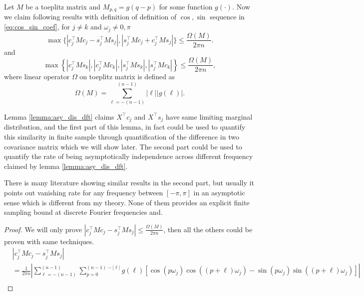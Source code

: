 \begin{lem}
\label{lemma: bound_toeplitz}
Let $M$ be a toeplitz matrix and $M_{p,q} = g(q-p)$ for some function $g(\cdot)$. Now we claim following results with definition of definition of $\cos, \sin$ sequence in \ref{eq:cos_sin_coef}, for $j\neq k$ and $\omega_j \neq 0, \pi$
\begin{equation*}
\max\{|c_j^\top M c_j - s_j^\top M s_j|, |s_j^\top M c_j + c_j^\top M s_j|\}\le \frac{\Omega(M)}{2\pi n}.
\end{equation*}
and 
\begin{equation*}
\max\left\{|c_j^\top M s_k|, |c_j^\top M c_k|, |s_j^\top M s_k|, |s_j^\top M c_k|\right\} \le \frac{\Omega(M)}{2\pi n},
\end{equation*}
where linear operator $\Omega$ on toeplitz matrix is defined as 
\begin{equation}
\Omega(M) = \sum_{\ell = -(n-1)}^{(n-1)} |\ell| |g(\ell)|.   
\end{equation}
\begin{remark}
Lemma \ref{lemma:asy_dis_dft} claims $X^\top c_j$ and $X^\top s_j$ have same limiting marginal distribution, 
and the first part of this lemma, in fact could be used to quantify this similarity in finite sample through quantification of the difference in two covariance matrix
which we will show later. The second part could be used to quantify the rate of being asymptotically independence across different frequency claimed by lemma \ref{lemma:asy_dis_dft}. \par 
There is many literature showing similar results in the second part, but usually it points out vanishing rate for any frequency between $[-\pi, \pi]$ in an asymptotic sense which is different from my theory. None of them provides an explicit finite sampling bound at discrete Fourier frequencies and. 
\end{remark}
\begin{proof}
We will only prove $|c_j^\top M c_j - s_j^\top M s_j|\le \frac{\Omega(M)}{2\pi n}$, then all the others could be proven with same techniques. %
\begin{equation}
\label{eq:similarity_real_im}
\begin{aligned}
 &|c_j^\top M c_j - s_j^\top M s_j| \\
 &=\frac{1}{2\pi n}\left|\sum_{\ell=-(n-1)}^{(n-1)} \sum_{p=0}^{(n-1)-\left|\ell\right|} g(\ell)\left[ \cos(p\omega_j)\cos((p+\ell)\omega_j) - \sin(p\omega_j)\sin((p+\ell)\omega_j)\right]\right|\\

\end{aligned}
\end{equation}
\end{proof}
\end{lem}

